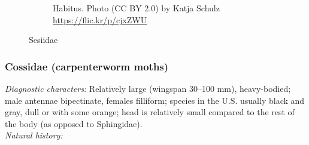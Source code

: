 \documentclass[letterpaper, 11pt]{article}
\begin{document}
\begin{figure}[ht!]
\begin{subfigure}[ht!]{0.40\textwidth}
        \caption{Habitus. Photo (CC BY 2.0) by Katja Schulz \url{https://flic.kr/p/cjxZWU}}
        \label{fig:sesiid2}
    \end{subfigure}
    \caption{Sesiidae}\label{fig:sesiids}
\end{figure}

\subsubsection{Cossidae (carpenterworm moths)}
\noindent{}\textit{Diagnostic characters:} Relatively large (wingspan 30--100 mm), heavy-bodied; male antennae bipectinate, females filliform; species in the U.S. usually black and gray, dull or with some orange; head is relatively small compared to the rest of the body (as opposed to Sphingidae).\\

\noindent{}\textit{Natural history:} 
\end{document}
